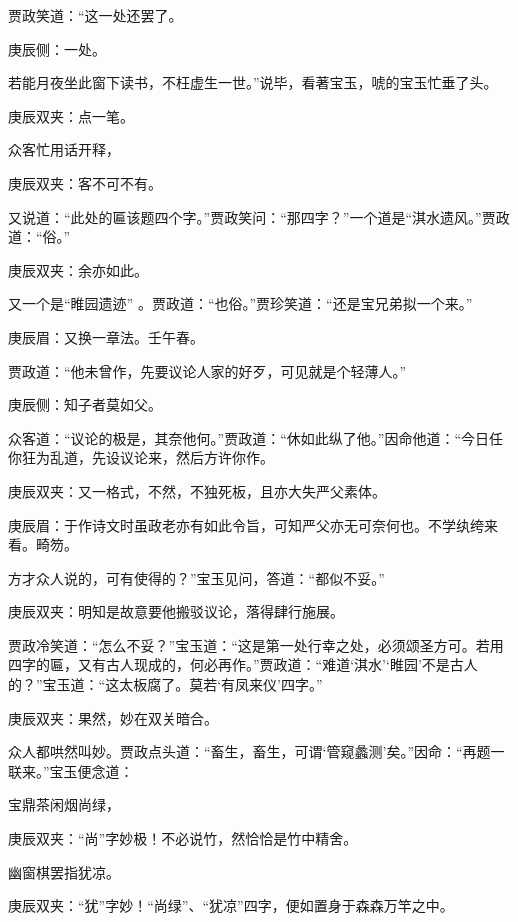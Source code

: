 \begin{parag}
    贾政笑道：“这一处还罢了。\begin{note}庚辰侧：一处。\end{note}若能月夜坐此窗下读书，不枉虚生一世。”说毕，看著宝玉，唬的宝玉忙垂了头。\begin{note}庚辰双夹：点一笔。\end{note}众客忙用话开释，\begin{note}庚辰双夹：客不可不有。\end{note}又说道：“此处的匾该题四个字。”贾政笑问：“那四字？”一个道是“淇水遗风。”贾政道：“俗。”\begin{note}庚辰双夹：余亦如此。\end{note}又一个是“睢园遗迹” 。贾政道：“也俗。”贾珍笑道：“还是宝兄弟拟一个来。”\begin{note}庚辰眉：又换一章法。壬午春。\end{note}贾政道：“他未曾作，先要议论人家的好歹，可见就是个轻薄人。”\begin{note}庚辰侧：知子者莫如父。\end{note}众客道：“议论的极是，其奈他何。”贾政道：“休如此纵了他。”因命他道：“今日任你狂为乱道，先设议论来，然后方许你作。\begin{note}庚辰双夹：又一格式，不然，不独死板，且亦大失严父素体。\end{note}\begin{note}庚辰眉：于作诗文时虽政老亦有如此令旨，可知严父亦无可奈何也。不学纨绔来看。畸笏。\end{note}方才众人说的，可有使得的？”宝玉见问，答道：“都似不妥。”\begin{note}庚辰双夹：明知是故意要他搬驳议论，落得肆行施展。\end{note}贾政冷笑道：“怎么不妥？”宝玉道：“这是第一处行幸之处，必须颂圣方可。若用四字的匾，又有古人现成的，何必再作。”贾政道：“难道‘淇水’‘睢园’不是古人的？”宝玉道：“这太板腐了。莫若‘有凤来仪’四字。”\begin{note}庚辰双夹：果然，妙在双关暗合。\end{note}众人都哄然叫妙。贾政点头道：“畜生，畜生，可谓‘管窥蠡测’矣。”因命：“再题一联来。”宝玉便念道：
\end{parag}


\begin{poem}
    \begin{pl}宝鼎茶闲烟尚绿，\end{pl}
    \begin{note}庚辰双夹：“尚”字妙极！不必说竹，然恰恰是竹中精舍。\end{note}

    \begin{pl}幽窗棋罢指犹凉。\end{pl}
    \begin{note}庚辰双夹：“犹”字妙！“尚绿”、“犹凉”四字，便如置身于森森万竿之中。\end{note}
\end{poem}


